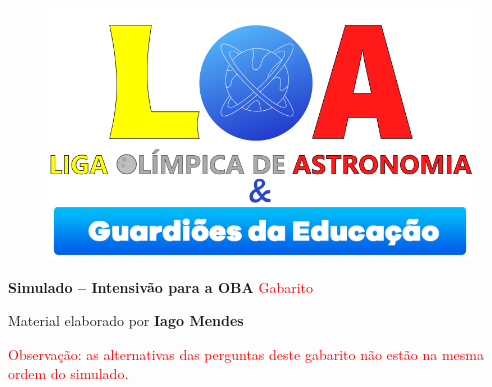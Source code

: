 \documentclass[a4paper, 12pt]{article}
\newcommand{\red}[1]{\textcolor{red}{#1}}
\begin{document}
    \begin{figure}
        \centering
        \href{https://ligaolimpicadeastronomia.com.br/}{\includegraphics[scale=0.6]{./img/logos.png}}
    \end{figure}
    \begin{center}
        \begin{large}
            \textbf{Simulado -- Intensivão para a OBA}
            \linebreak \red{Gabarito}
        \end{large}
        \end{center}
    \begin{flushright}
        Material elaborado por \textbf{Iago Mendes}
    \end{flushright}
    \red{Observação: as alternativas das perguntas deste gabarito não estão na mesma ordem do simulado.}
\end{document}
